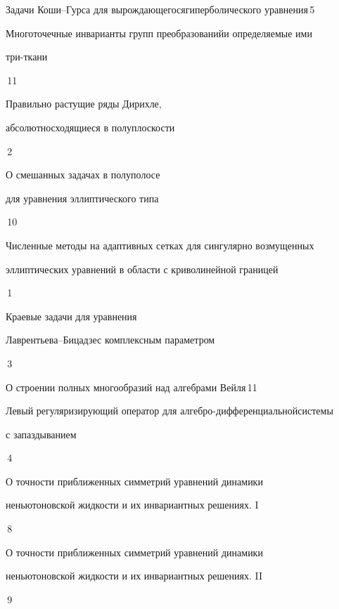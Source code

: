 

{Задачи Коши--Гурса для вырождающегося\newline гиперболического уравнения}{\No\,5}




{Многоточечные инварианты групп преобразований\newline и определяемые ими


три-ткани}{\No\,11}




{Правильно растущие ряды Дирихле,


абсолютно\newline сходящиеся в полуплоскости}{\No\,2}




{О смешанных задачах в полуполосе


для уравнения эллиптического типа}{\No\,10}




{Численные методы на адаптивных сетках для сингулярно возмущенных\newline


эллиптических уравнений в области с криволинейной границей}{\No\,1}




{Краевые задачи для уравнения 


Лаврентьева--Бицадзе\newline с комплексным параметром}{\No\,3}




{О строении полных многообразий над алгебрами Вейля}{\No\,11}




{Левый регуляризирующий оператор для алгебро-дифференциальной\newline системы 


с запаздыванием}{\No\,4}




{О точности приближенных симметрий уравнений динамики \newline


неньютоновской жидкости и их инвариантных решениях. I}{\No\,8}




{О точности приближенных симметрий уравнений динамики \newline


неньютоновской жидкости и их инвариантных решениях. II}{\No\,9}











